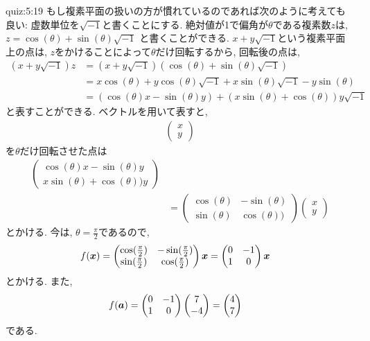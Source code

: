 \begin{answerof}{quiz:5:19}
  もし複素平面の扱いの方が慣れているのであれば次のように考えても良い:
  虚数単位を$\sqrt{-1}$と書くことにする.
  絶対値が1で偏角が$\theta$である複素数$z$は,
  $z=\cos(\theta)+\sin(\theta)\sqrt{-1}$
  と書くことができる.
  $x+y\sqrt{-1}$という複素平面上の点は,
  $z$をかけることによって$\theta$だけ回転するから,
  回転後の点は,
  \begin{align*}
    (x+y\sqrt{-1})z&=(x+y\sqrt{-1})(\cos(\theta)+\sin(\theta)\sqrt{-1})\\
    &=x\cos(\theta)+y\cos(\theta)\sqrt{-1}+x\sin(\theta)\sqrt{-1}-y\sin(\theta)\\
    &=(\cos(\theta)x-\sin(\theta)y)+(x\sin(\theta)+\cos(\theta))y\sqrt{-1}
  \end{align*}
  と表すことができる.
  ベクトルを用いて表すと,
  \begin{align*}
    \begin{pmatrix}x\\y\end{pmatrix}
  \end{align*}
  を$\theta$だけ回転させた点は
  \begin{align*}
      \begin{pmatrix}
        \cos(\theta)x-\sin(\theta)y\\x\sin(\theta)+\cos(\theta))y
      \end{pmatrix}\\
      &=
      \begin{pmatrix}
        \cos(\theta)&-\sin(\theta)\\\sin(\theta)&\cos(\theta))
      \end{pmatrix}
      \begin{pmatrix}x\\y\end{pmatrix}
  \end{align*}
  とかける.
  今は, $\theta=\frac{\pi}{2}$であるので,
  \begin{align*}
    f(\boldsymbol{x})&=
    \begin{pmatrix}
      \cos(\frac{\pi}{2})&-\sin(\frac{\pi}{2})\\
      \sin(\frac{\pi}{2})&\cos(\frac{\pi}{2})
    \end{pmatrix}
    \boldsymbol{x}=
    \begin{pmatrix}
      0&-1\\
      1&0
    \end{pmatrix}
    \boldsymbol{x}
  \end{align*}
  とかける.  また,
  \begin{align*}
    f(\boldsymbol{a})&=
    \begin{pmatrix}
      0&-1\\
      1&0
    \end{pmatrix}
    \begin{pmatrix}
      7\\
      -4
    \end{pmatrix}
    =
    \begin{pmatrix}
      4\\7
    \end{pmatrix}
  \end{align*}
  である.
  
\end{answerof}


